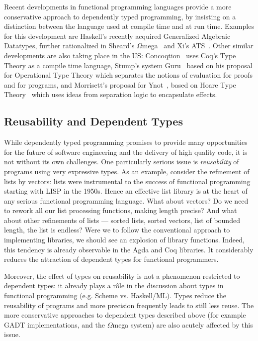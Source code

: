 \documentclass[a4paper]{article}
\begin{document}
Recent developments in functional programming
languages provide a more conservative approach to dependently typed
programming, by insisting on a distinction between the language used
at compile time and at run time. Examples for this development are
Haskell's recently acquired Generalized Algebraic Datatypes, further
rationalized in Sheard's
\(\Omega\)mega~\cite{omega,sheard:curry-howard} and Xi's
ATS~\cite{ATS-frocos05}. Other similar developments are also taking
place in the US: Concoqtion~\cite{concoqtion1,concoqtion2}
uses Coq's
Type Theory as a compile time language, Stump's system
Guru~\cite{guru} based on his proposal for Operational Type
Theory which separates the notions of evaluation for
proofs and for programs, and Morrisett's proposal for
Ynot~\cite{ynot,morrisett:ynot}, based on Hoare Type
Theory~\cite{nanevski:htt} which uses ideas from separation logic to
encapsulate effects.

\subsection*{Reusability and Dependent Types}
\label{sec:main-rese-chall}

While dependently typed programming promises to provide many
opportunities for the future of software engineering and the delivery
of high quality code, it is not without its own challenges. One
particularly serious
issue %
is 
\emph{reusability} %
of programs using very expressive types. As an example, consider the
refinement of lists by vectors: lists were instrumental to the success
of functional programming starting with LISP in the 1950s. Hence an
effective list library is at the heart of any serious functional
programming language. What about vectors? Do we need to rework all our
list processing functions, making length precise? And what about other
refinements of lists --- sorted lists, sorted vectors, list of bounded
length, the list is endless? Were we to follow the conventional
approach to implementing libraries, we should see an explosion of
library functions. Indeed, this tendency is already observable in the
Agda and Coq libraries. It considerably reduces the attraction of
dependent types for functional programmers.

Moreover, the effect of types on reusability is not a phenomenon
restricted to dependent types: it already plays a r\^{o}le in the
discussion about types in functional programming (e.g. Scheme vs.
Haskell/ML). Types reduce the
reusability of programs and more precision frequently leads to still less 
reuse. The more
conservative approaches to dependent types described above
(for example GADT implementations, and the $\Omega$mega system) 
are also acutely affected by this issue.
\end{document}
